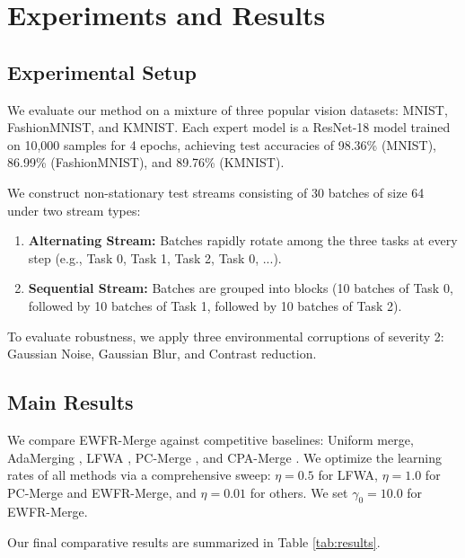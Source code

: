 \documentclass{article}
\theoremstyle{plain}
\theoremstyle{definition}
\theoremstyle{remark}
\begin{document}
\section{Experiments and Results}
\label{sec:experiments}

\subsection{Experimental Setup}
We evaluate our method on a mixture of three popular vision datasets: MNIST, FashionMNIST, and KMNIST. Each expert model is a ResNet-18 model trained on 10,000 samples for 4 epochs, achieving test accuracies of 98.36\% (MNIST), 86.99\% (FashionMNIST), and 89.76\% (KMNIST).

We construct non-stationary test streams consisting of 30 batches of size 64 under two stream types:
\begin{enumerate}
    \item \textbf{Alternating Stream:} Batches rapidly rotate among the three tasks at every step (e.g., Task 0, Task 1, Task 2, Task 0, ...).
    \item \textbf{Sequential Stream:} Batches are grouped into blocks (10 batches of Task 0, followed by 10 batches of Task 1, followed by 10 batches of Task 2).
\end{enumerate}

To evaluate robustness, we apply three environmental corruptions of severity 2: Gaussian Noise, Gaussian Blur, and Contrast reduction.

\subsection{Main Results}
We compare EWFR-Merge against competitive baselines: Uniform merge, AdaMerging \cite{adamerging}, LFWA \cite{lfwa}, PC-Merge \cite{pc_merge}, and CPA-Merge \cite{cpa_merge}. We optimize the learning rates of all methods via a comprehensive sweep: $\eta = 0.5$ for LFWA, $\eta = 1.0$ for PC-Merge and EWFR-Merge, and $\eta = 0.01$ for others. We set $\gamma_0 = 10.0$ for EWFR-Merge.

Our final comparative results are summarized in Table \ref{tab:results}.
\end{document}
